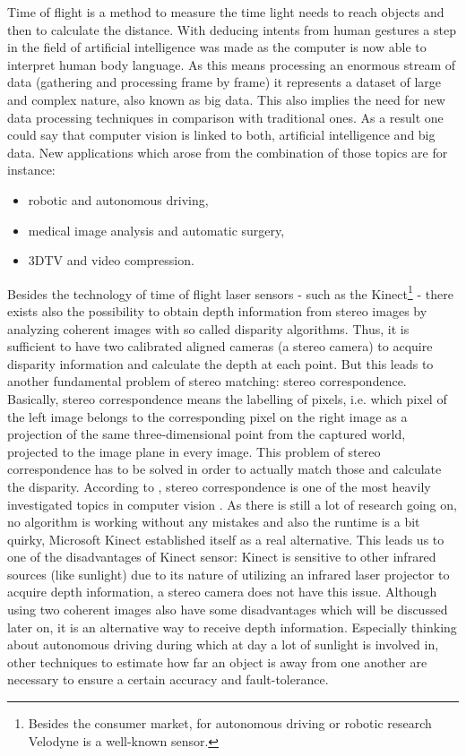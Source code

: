 Time of flight is a method to measure the time light needs to reach objects and then to calculate the distance.
\newline\newline\noindent With deducing intents from human gestures a step in the field of artificial intelligence was made as the computer is now able to interpret human body language.
As this means processing an enormous stream of data (gathering and processing frame by frame) it represents a dataset of large and complex nature, also known as big data.
This also implies the need for new data processing techniques in comparison with traditional ones.
As a result one could say that computer vision is linked to both, artificial intelligence and big data.
New applications which arose from the combination of those topics are for instance:

\begin{itemize}
  \item robotic and autonomous driving,
  \item medical image analysis and automatic surgery,
  \item 3DTV and video compression.
\end{itemize}

\noindent Besides the technology of time of flight laser sensors - such as the Kinect\footnote{Besides the consumer market, for autonomous driving or robotic research Velodyne is a well-known sensor.} - there exists also the possibility to obtain depth information from stereo images by analyzing coherent images with so called disparity algorithms.
Thus, it is sufficient to have two calibrated aligned cameras (a stereo camera) to acquire disparity information and calculate the depth at each point.
But this leads to another fundamental problem of stereo matching: stereo correspondence.
Basically, stereo correspondence means the labelling of pixels, i.e. which pixel of the left image belongs to the corresponding pixel on the right image as a projection of the same three-dimensional point from the captured world, projected to the image plane in every image.
This problem of stereo correspondence has to be solved in order to actually match those and calculate the disparity.
According to \citeauthor{scharstein2002taxonomy}, stereo correspondence is one of the most heavily investigated topics in computer vision \citep{scharstein2002taxonomy}.
As there is still a lot of research going on, no algorithm is working without any mistakes and also the runtime is a bit quirky, Microsoft Kinect established itself as a real alternative.
This leads us to one of the disadvantages of Kinect sensor: Kinect is sensitive to other infrared sources (like sunlight) due to its nature of utilizing an infrared laser projector to acquire depth information, a stereo camera does not have this issue.
Although using two coherent images also have some disadvantages which will be discussed later on, it is an alternative way to receive depth information.
Especially thinking about autonomous driving during which at day a lot of sunlight is involved in, other techniques to estimate how far an object is away from one another are necessary to ensure a certain accuracy and fault-tolerance.

